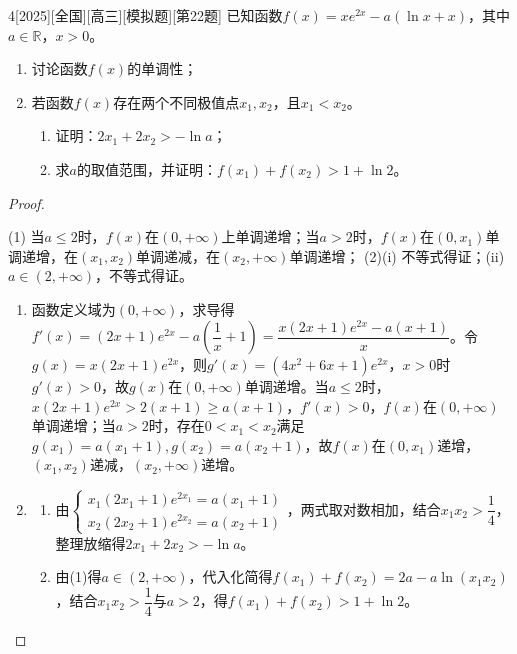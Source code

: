 \documentclass[
noshowanswers,        %
answercolor=red,    %
paper=a4,           %
sectioncolor=cyan,  %
subsectioncolor=cyan,
exercisecolor=orange, %
examplecolor=cyan,    %
bianshicolor=purple  %
]{biscuits}
\begin{document}
\begin{bianshi}{4}[2025][全国][高三][模拟题][第22题]
	已知函数$f(x)=xe^{2x}-a(\ln x+x)$，其中$a\in\mathbb{R}$，$x>0$。
	\begin{enumerate}
		\item 讨论函数$f(x)$的单调性；
		\item 若函数$f(x)$存在两个不同极值点$x_1,x_2$，且$x_1<x_2$。
		\begin{enumerate}
			\item 证明：$2x_1+2x_2>-\ln a$；
			\item 求$a$的取值范围，并证明：$f(x_1)+f(x_2)>1+\ln2$。
		\end{enumerate}
	\end{enumerate}
	\begin{proof}
		\begin{answer}
			(1) 当$a\leq 2$时，$f(x)$在$(0,+\infty)$上单调递增；当$a>2$时，$f(x)$在$(0,x_1)$单调递增，在$(x_1,x_2)$单调递减，在$(x_2,+\infty)$单调递增；
			(2)(i) 不等式得证；(ii) $a\in(2,+\infty)$，不等式得证。
		\end{answer}
		\begin{solutions}
			\begin{enumerate}
				\item 函数定义域为$(0,+\infty)$，求导得$f'(x)=(2x+1)e^{2x}-a\left(\dfrac{1}{x}+1\right)=\dfrac{x(2x+1)e^{2x}-a(x+1)}{x}$。令$g(x)=x(2x+1)e^{2x}$，则$g'(x)=(4x^2+6x+1)e^{2x}$，$x>0$时$g'(x)>0$，故$g(x)$在$(0,+\infty)$单调递增。当$a\leq 2$时，$x(2x+1)e^{2x}>2(x+1)\geq a(x+1)$，$f'(x)>0$，$f(x)$在$(0,+\infty)$单调递增；当$a>2$时，存在$0<x_1<x_2$满足$g(x_1)=a(x_1+1),g(x_2)=a(x_2+1)$，故$f(x)$在$(0,x_1)$递增，$(x_1,x_2)$递减，$(x_2,+\infty)$递增。
				\item \begin{enumerate}
					\item 由$\begin{cases}x_1(2x_1+1)e^{2x_1}=a(x_1+1)\\x_2(2x_2+1)e^{2x_2}=a(x_2+1)\end{cases}$，两式取对数相加，结合$x_1x_2>\dfrac14$，整理放缩得$2x_1+2x_2>-\ln a$。
					\item 由(1)得$a\in(2,+\infty)$，代入化简得$f(x_1)+f(x_2)=2a-a\ln(x_1x_2)$，结合$x_1x_2>\dfrac14$与$a>2$，得$f(x_1)+f(x_2)>1+\ln2$。
				\end{enumerate}
			\end{enumerate}
		\end{solutions}
	\end{proof}
\end{bianshi}
\end{document}
